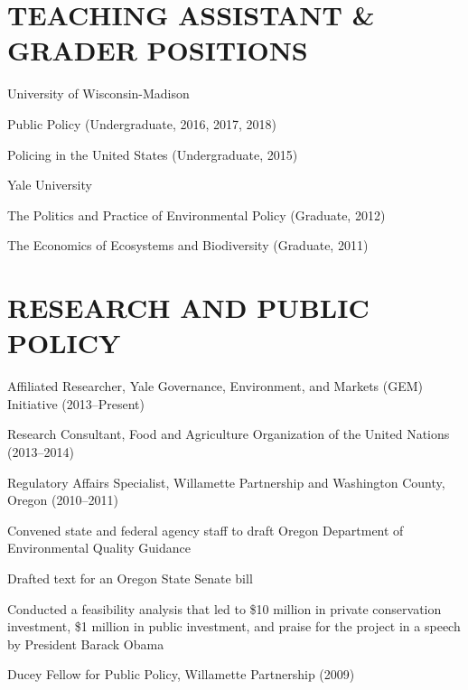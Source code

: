 \documentclass[11pt,]{article}
\renewenvironment{itemize}{
  \begin{list}{}{
    \setlength{\leftmargin}{1.5em}
  }
}{
  \end{list}
}
\begin{document}
\hypertarget{teaching-assistant-grader-positions}{%
\section{TEACHING ASSISTANT \& GRADER
POSITIONS}\label{teaching-assistant-grader-positions}}

University of Wisconsin-Madison

\begin{itemize}
\item
  Public Policy (Undergraduate, 2016, 2017, 2018)
\item
  Policing in the United States (Undergraduate, 2015)
\end{itemize}

Yale University

\begin{itemize}
\item
  The Politics and Practice of Environmental Policy (Graduate, 2012)
\item
  The Economics of Ecosystems and Biodiversity (Graduate, 2011)
\end{itemize}

\hypertarget{research-and-public-policy}{%
\section{RESEARCH AND PUBLIC POLICY}\label{research-and-public-policy}}

Affiliated Researcher, Yale Governance, Environment, and Markets (GEM)
Initiative (2013--Present)

Research Consultant, Food and Agriculture Organization of the United
Nations (2013--2014)

Regulatory Affairs Specialist, Willamette Partnership and Washington
County, Oregon (2010--2011)

\begin{itemize}
\item
  Convened state and federal agency staff to draft Oregon Department of
  Environmental Quality Guidance
\item
  Drafted text for an Oregon State Senate bill
\item
  Conducted a feasibility analysis that led to \$10 million in private
  conservation investment, \$1 million in public investment, and praise
  for the project in a speech by President Barack Obama
\end{itemize}

Ducey Fellow for Public Policy, Willamette Partnership (2009)
\end{document}
